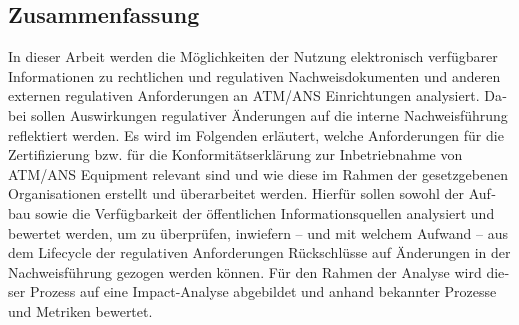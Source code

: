 \begin{otherlanguage}{ngerman}
    \chapter*{Zusammenfassung}

    In dieser Arbeit werden die Möglichkeiten der Nutzung elektronisch verfügbarer Informationen zu rechtlichen und regulativen Nachweisdokumenten und anderen externen regulativen Anforderungen an ATM/ANS Einrichtungen analysiert. 
    Dabei sollen Auswirkungen regulativer Änderungen auf die interne Nachweisführung reflektiert werden. 
    Es wird im Folgenden erläutert, welche Anforderungen für die Zertifizierung bzw. für die Konformitätserklärung  zur Inbetriebnahme von ATM/ANS Equipment relevant sind und wie diese im Rahmen der gesetzgebenen Organisationen erstellt und überarbeitet werden. 
    Hierfür sollen sowohl der Aufbau sowie die Verfügbarkeit der öffentlichen Informationsquellen analysiert und bewertet werden, um zu überprüfen, inwiefern -- und mit welchem Aufwand -- aus dem Lifecycle der regulativen Anforderungen Rückschlüsse auf Änderungen in der Nachweisführung gezogen werden können.
    Für den Rahmen der Analyse wird dieser Prozess auf eine Impact-Analyse abgebildet und anhand bekannter Prozesse und Metriken bewertet.
 
\end{otherlanguage}

